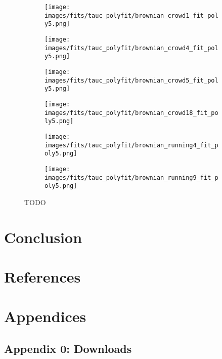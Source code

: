 \documentclass[10pt]{article}
\begin{document}
\begin{figure}[H]
\begin{subfigure}[t]{.5\textwidth}
  \centering
 \texttt{[image: images/fits/tauc\_polyfit/brownian\_crowd1\_fit\_poly5.png]}
  \caption{}
\end{subfigure}%
\hfill
\begin{subfigure}[t]{.5\textwidth}
  \centering
  \texttt{[image: images/fits/tauc\_polyfit/brownian\_crowd4\_fit\_poly5.png]}
  \caption{}
\end{subfigure}
\par\bigskip
\begin{subfigure}[t]{.5\textwidth}
  \centering
 \texttt{[image: images/fits/tauc\_polyfit/brownian\_crowd5\_fit\_poly5.png]}
  \caption{}
\end{subfigure}%
\hfill
\begin{subfigure}[t]{.5\textwidth}
  \centering
  \texttt{[image: images/fits/tauc\_polyfit/brownian\_crowd18\_fit\_poly5.png]}
  \caption{}
\end{subfigure}
\par\bigskip
\begin{subfigure}[t]{.5\textwidth}
  \centering
 \texttt{[image: images/fits/tauc\_polyfit/brownian\_running4\_fit\_poly5.png]}
  \caption{}
\end{subfigure}%
\hfill
\begin{subfigure}[t]{.5\textwidth}
  \centering
  \texttt{[image: images/fits/tauc\_polyfit/brownian\_running9\_fit\_poly5.png]}
  \caption{}
\end{subfigure}
\caption{TODO}
\label{fig:tauc_polyfit_params}
\end{figure}




\section{Conclusion}


\clearpage
\section{References}
\printbibliography[heading=none]

\clearpage
\section{Appendices}
\subsection{Appendix 0: Downloads}
\end{document}
